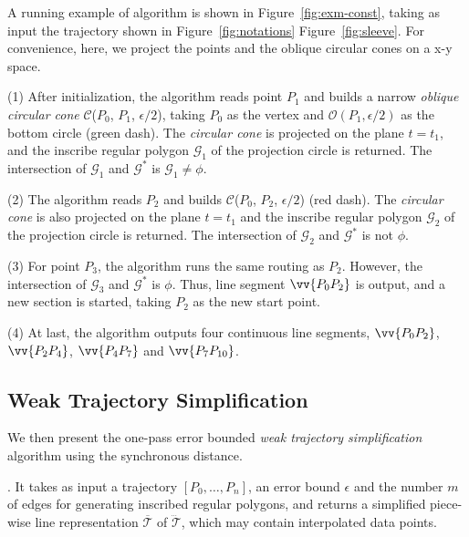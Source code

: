 \begin{example}
\label{exm-alg-conest}
A running example of algorithm \cist is shown in Figure~\ref{fig:exm-const},  taking as input the trajectory shown in Figure~\ref{fig:notations} Figure~\ref{fig:sleeve}.
For convenience, here, we project the points and the oblique circular cones on a x-y space.

\ni (1) After initialization, the \cist algorithm reads point $P_1$ and builds a narrow \emph{oblique circular cone} $\mathcal{C}$($P_0$, $P_{1}$, $\epsilon/2$), taking $P_0$ as the vertex and $\mathcal{O}(P_1, \epsilon/2)$ as the bottom circle (green dash). The \emph{circular cone} is projected on the plane $t=t_1$, and the inscribe regular polygon $\mathcal{G}_1$ of the projection circle is returned. The intersection of $\mathcal{G}_1$ and $\mathcal{G}^*$ is $\mathcal{G}_1 \ne \phi$.

\ni (2) The algorithm reads $P_2$ and builds $\mathcal{C}$($P_0$, $P_{2}$, $\epsilon/2$) (red dash). The \emph{circular cone} is also projected on the plane $t=t_1$ and the inscribe regular polygon $\mathcal{G}_2$ of the projection circle is returned. The intersection of $\mathcal{G}_2$ and $\mathcal{G}^*$ is not $\phi$.

\ni (3) For point $P_3$, the algorithm runs the same routing as $P_2$. However, the intersection of $\mathcal{G}_3$ and $\mathcal{G}^*$ is $\phi$. Thus, line segment $\vv{P_0P_2}$ is output, and a new section is started, taking $P_2$ as the new start point.

\ni (4) At last, the algorithm outputs four continuous line segments, \ie $\vv{P_0P_2}$, $\vv{P_2P_4}$, $\vv{P_4P_{7}}$ and $\vv{P_7P_{10}}$.
\end{example}





\subsection{Weak Trajectory Simplification}

We then present the one-pass error bounded {\em weak trajectory simplification} algorithm using the synchronous distance.




.
It takes as input a trajectory ${[P_0, \ldots, P_n]}$, an error bound $\epsilon$ and the number $m$ of edges for generating inscribed
regular polygons, and returns a simplified  piece-wise line representation $\overline{\mathcal{T}}$ of $\dddot{\mathcal{T}}$,
which may contain interpolated data points.

